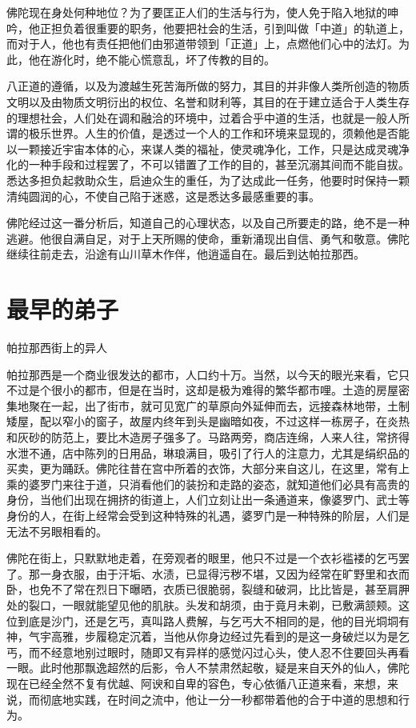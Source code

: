 \documentclass[12pt,twoside,openany]{book}
\begin{document}
佛陀现在身处何种地位？为了要匡正人们的生活与行为，使人免于陷入地狱的呻吟，他正担负着很重要的职务，他要把社会的生活，引到叫做「中道」的轨道上，而对于人，他也有责任把他们由邪道带领到「正道」上，点燃他们心中的法灯。为此，他在游化时，绝不能心慌意乱，坏了传教的目的。

八正道的遵循，以及为渡越生死苦海所做的努力，其目的并非像人类所创造的物质文明以及由物质文明衍出的权位、名誉和财利等，其目的在于建立适合于人类生存的理想社会，人们处在调和融洽的环境中，过着合乎中道的生活，也就是一般人所谓的极乐世界。人生的价值，是透过一个人的工作和环境来显现的，须赖他是否能以一颗接近宇宙本体的心，来谋人类的福祉，使灵魂净化，工作，只是达成灵魂净化的一种手段和过程罢了，不可以错置了工作的目的，甚至沉溺其间而不能自拔。悉达多担负起救助众生，启迪众生的重任，为了达成此一任务，他要时时保持一颗清纯圆润的心，不使自己陷于迷惑，这是悉达多最感重要的事。

佛陀经过这一番分析后，知道自己的心理状态，以及自己所要走的路，绝不是一种逃避。他很自满自足，对于上天所赐的使命，重新涌现出自信、勇气和敬意。佛陀继续往前走去，沿途有山川草木作伴，他逍遥自在。最后到达帕拉那西。

\section{最早的弟子}\label{sec2.4}

帕拉那西街上的异人

帕拉那西是一个商业很发达的都市，人口约十万。当然，以今天的眼光来看，它只不过是个很小的都市，但是在当时，这却是极为难得的繁华都市哩。土造的房屋密集地聚在一起，出了街市，就可见宽广的草原向外延伸而去，远接森林地带，土制矮屋，配以窄小的窗子，故屋内终年到头是幽暗如夜，不过这样一栋房子，在炎热和灰砂的防范上，要比木造房子强多了。马路两旁，商店连绵，人来人往，常挤得水泄不通，店中陈列的日用品，琳琅满目，吸引了行人的注意力，尤其是绢织品的买卖，更为踊跃。佛陀往昔在宫中所着的衣饰，大部分来自这儿，在这里，常有上乘的婆罗门来往于道，只消看他们的装扮和走路的姿态，就知道他们必具有高贵的身份，当他们出现在拥挤的街道上，人们立刻让出一条通道来，像婆罗门、武士等身份的人，在街上经常会受到这种特殊的礼遇，婆罗门是一种特殊的阶层，人们是无法不另眼相看的。

佛陀在街上，只默默地走着，在旁观者的眼里，他只不过是一个衣衫褴褛的乞丐罢了。那一身衣服，由于汗垢、水渍，已显得污秽不堪，又因为经常在旷野里和衣而卧，也免不了常在烈日下曝晒，衣质已很脆弱，裂缝和破洞，比比皆是，甚至肩胛处的裂口，一眼就能望见他的肌肤。头发和胡须，由于竟月未剃，已敷满颔颊。这位到底是沙门，还是乞丐，真叫路人费解，与乞丐大不相同的是，他的目光垌垌有神，气宇高雅，步履稳定沉着，当他从你身边经过先看到的是这一身破烂以为是乞丐，而不经意地别过眼时，随即又有异样的感觉闪过心头，使人忍不住要回头再看一眼。此时他那飘逸超然的后影，令人不禁肃然起敬，疑是来自天外的仙人，佛陀现在已经全然不复有优越、阿谀和自卑的容色，专心依循八正道来看，来想，来说，而彻底地实践，在时间之流中，他让一分一秒都带着他的合于中道的思想和行为。
\end{document}
